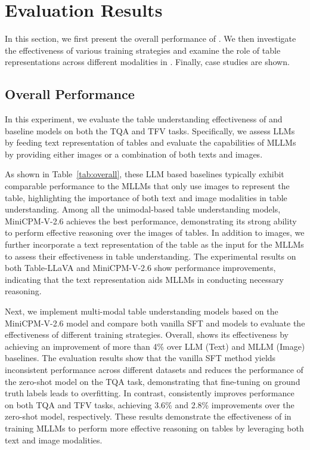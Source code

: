 \section{Evaluation Results}
In this section, we first present the overall performance of \method{}. We then investigate the effectiveness of various training strategies and examine the role of table representations across different modalities in \method{}. Finally, case studies are shown.

\subsection{Overall Performance}
In this experiment, we evaluate the table understanding effectiveness of \method{} and baseline models on both the TQA and TFV tasks. Specifically, we assess LLMs by feeding text representation of tables and evaluate the capabilities of MLLMs by providing either images or a combination of both texts and images.


As shown in Table~\ref{tab:overall}, these LLM based baselines typically exhibit comparable performance to the MLLMs that only use images to represent the table, highlighting the importance of both text and image modalities in table understanding. Among all the unimodal-based table understanding models, MiniCPM-V-2.6 achieves the best performance, demonstrating its strong ability to perform effective reasoning over the images of tables.
In addition to images, we further incorporate a text representation of the table as the input for the MLLMs to assess their effectiveness in table understanding. The experimental results on both Table-LLaVA and MiniCPM-V-2.6 show performance improvements, indicating that the text representation aids MLLMs in conducting necessary reasoning.

Next, we implement multi-modal table understanding models based on the MiniCPM-V-2.6 model and compare both vanilla SFT and \method{} models to evaluate the effectiveness of different training strategies. Overall, \method{} shows its effectiveness by achieving an improvement of more than 4\% over LLM (Text) and MLLM (Image) baselines. The evaluation results show that the vanilla SFT method yields inconsistent performance across different datasets and reduces the performance of the zero-shot model on the TQA task, demonstrating that fine-tuning on ground truth labels leads to overfitting. In contrast, \method{} consistently improves performance on both TQA and TFV tasks, achieving 3.6\% and 2.8\% improvements over the zero-shot model, respectively. These results demonstrate the effectiveness of \method{} in training MLLMs to perform more effective reasoning on tables by leveraging both text and image modalities.



